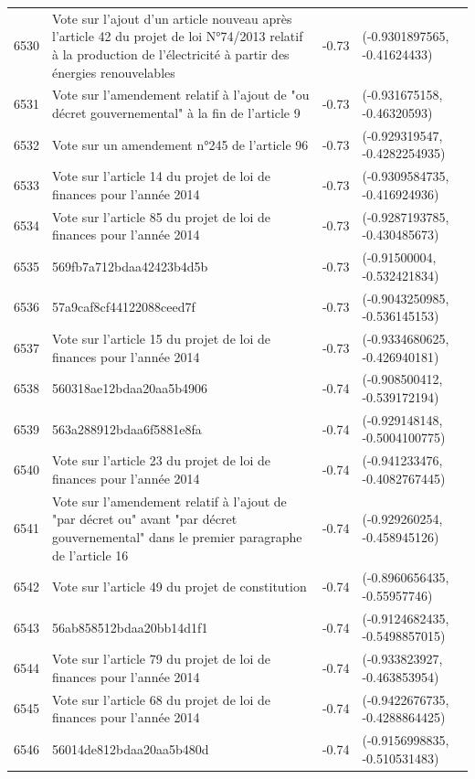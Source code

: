 \begin{table}[ht]
\begin{tabular}{rlrl}
  6530 & Vote sur l'ajout d'un article nouveau après l'article 42 du projet de loi N°74/2013 relatif à la production de l'électricité à partir des énergies renouvelables & -0.73 & (-0.9301897565, -0.41624433) \\ 
  6531 & Vote sur l'amendement relatif à l'ajout de "ou décret gouvernemental" à la fin de l'article 9 & -0.73 & (-0.931675158, -0.46320593) \\ 
  6532 & Vote sur un amendement n°245 de l'article 96 & -0.73 & (-0.929319547, -0.4282254935) \\ 
  6533 & Vote sur l'article 14 du projet de loi de finances pour l'année 2014 & -0.73 & (-0.9309584735, -0.416924936) \\ 
  6534 & Vote sur l'article 85 du projet de loi de finances pour l'année 2014 & -0.73 & (-0.9287193785, -0.430485673) \\ 
  6535 & 569fb7a712bdaa42423b4d5b & -0.73 & (-0.91500004, -0.532421834) \\ 
  6536 & 57a9caf8cf44122088ceed7f & -0.73 & (-0.9043250985, -0.536145153) \\ 
  6537 & Vote sur l'article 15 du projet de loi de finances pour l'année 2014 & -0.73 & (-0.9334680625, -0.426940181) \\ 
  6538 & 560318ae12bdaa20aa5b4906 & -0.74 & (-0.908500412, -0.539172194) \\ 
  6539 & 563a288912bdaa6f5881e8fa & -0.74 & (-0.929148148, -0.5004100775) \\ 
  6540 & Vote sur l'article 23 du projet de loi de finances pour l'année 2014 & -0.74 & (-0.941233476, -0.4082767445) \\ 
  6541 & Vote sur l'amendement relatif à l'ajout de "par décret ou" avant "par décret gouvernemental" dans le premier paragraphe de l'article 16 & -0.74 & (-0.929260254, -0.458945126) \\ 
  6542 & Vote sur l'article 49 du projet de constitution & -0.74 & (-0.8960656435, -0.55957746) \\ 
  6543 & 56ab858512bdaa20bb14d1f1 & -0.74 & (-0.9124682435, -0.5498857015) \\ 
  6544 & Vote sur l'article 79 du projet de loi de finances pour l'année 2014 & -0.74 & (-0.933823927, -0.463853954) \\ 
  6545 & Vote sur l'article 68 du projet de loi de finances pour l'année 2014 & -0.74 & (-0.9422676735, -0.4288864425) \\ 
  6546 & 56014de812bdaa20aa5b480d & -0.74 & (-0.9156998835, -0.510531483) \\ 

\end{tabular}
\end{table}
